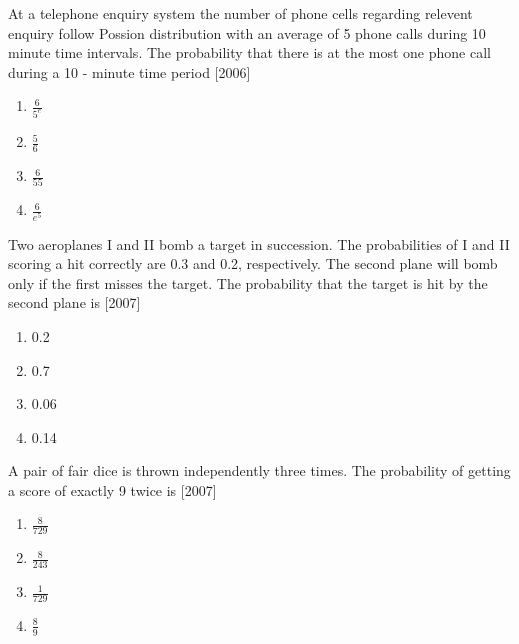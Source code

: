             \item At a telephone enquiry system the number of phone cells regarding relevent enquiry follow Possion distribution with an average of 5 phone calls during 10 minute time intervals. The probability that there is at the most one phone call during a 10 - minute time period \hfill [2006]

        \begin{multicols}{4}
        \begin{enumerate}
            \item $\frac{6}{5^e}$
            \item $\frac{5}{6}$
            \item $\frac{6}{55}$
            \item $\frac{6}{e^5}$   
        \end{enumerate}
        \end{multicols}


         \item Two aeroplanes I and II bomb a target in succession. The probabilities of I and II scoring a hit correctly are 0.3 and 0.2, respectively. The second plane will bomb only if the first misses the target. The probability that the target is hit by the second plane is      \hfill [2007]

        \begin{multicols}{4}
        \begin{enumerate}
            \item 0.2
            \item 0.7 
            \item 0.06
            \item 0.14 
        \end{enumerate}
        \end{multicols}

    \item A pair of fair dice is thrown independently three times. The probability of getting a score of exactly 9 twice is  \hfill [2007]


    \begin{multicols}{4}
        \begin{enumerate}
            \item $\frac{8}{729}$
            \item $\frac{8}{243}$
            \item $\frac{1}{729}$
            \item $\frac{8}{9}$   
        \end{enumerate}
        \end{multicols}



